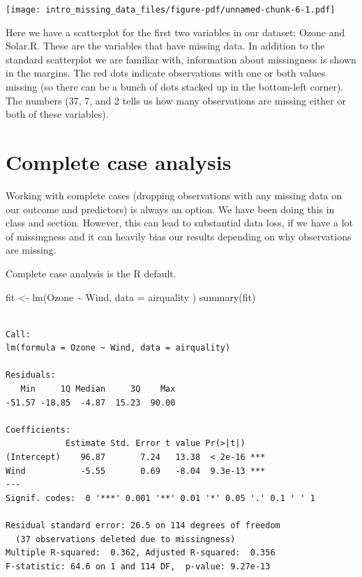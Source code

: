 \documentclass[
  letterpaper,
  DIV=11,
  numbers=noendperiod]{scrreprt}
\newenvironment{Shaded}{}{}
\newcommand{\AttributeTok}[1]{\textcolor[rgb]{0.49,0.56,0.16}{#1}}
\newcommand{\FunctionTok}[1]{\textcolor[rgb]{0.02,0.16,0.49}{#1}}
\newcommand{\NormalTok}[1]{#1}
\newcommand{\OtherTok}[1]{\textcolor[rgb]{0.00,0.44,0.13}{#1}}
\newcommand{\SpecialCharTok}[1]{\textcolor[rgb]{0.25,0.44,0.63}{#1}}
\begin{document}
\begin{center}
\texttt{[image: intro\_missing\_data\_files/figure-pdf/unnamed-chunk-6-1.pdf]}
\end{center}

Here we have a scatterplot for the first two variables in our dataset:
Ozone and Solar.R. These are the variables that have missing data. In
addition to the standard scatterplot we are familiar with, information
about missingness is shown in the margins. The red dots indicate
observations with one or both values missing (so there can be a bunch of
dots stacked up in the bottom-left corner). The numbers (37, 7, and 2
tells us how many observations are missing either or both of these
variables).

\newpage

\section{Complete case analysis}\label{complete-case-analysis}

Working with complete cases (dropping observations with any missing data
on our outcome and predictors) is always an option. We have been doing
this in class and section. However, this can lead to substantial data
loss, if we have a lot of missingness and it can heavily bias our
results depending on why observations are missing.

Complete case analysis is the R default.

\begin{Shaded}
\begin{Highlighting}[]
\NormalTok{  fit }\OtherTok{\textless{}{-}} \FunctionTok{lm}\NormalTok{(Ozone }\SpecialCharTok{\textasciitilde{}}\NormalTok{ Wind, }\AttributeTok{data =}\NormalTok{ airquality )}
  \FunctionTok{summary}\NormalTok{(fit)}
\end{Highlighting}
\end{Shaded}

\begin{verbatim}

Call:
lm(formula = Ozone ~ Wind, data = airquality)

Residuals:
   Min     1Q Median     3Q    Max 
-51.57 -18.85  -4.87  15.23  90.00 

Coefficients:
            Estimate Std. Error t value Pr(>|t|)    
(Intercept)    96.87       7.24   13.38  < 2e-16 ***
Wind           -5.55       0.69   -8.04  9.3e-13 ***
---
Signif. codes:  0 '***' 0.001 '**' 0.01 '*' 0.05 '.' 0.1 ' ' 1

Residual standard error: 26.5 on 114 degrees of freedom
  (37 observations deleted due to missingness)
Multiple R-squared:  0.362, Adjusted R-squared:  0.356 
F-statistic: 64.6 on 1 and 114 DF,  p-value: 9.27e-13
\end{verbatim}
\end{document}
